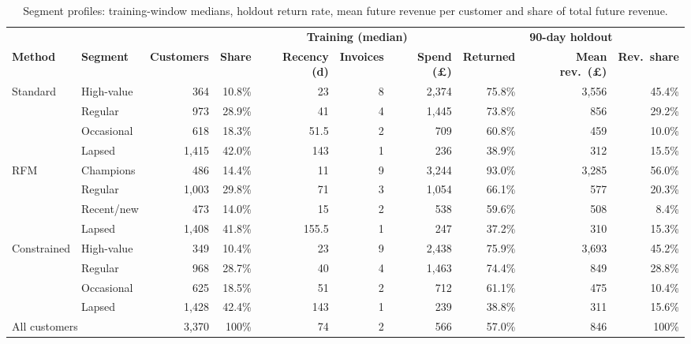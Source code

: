 \documentclass[conference,10pt]{IEEEtran}
\begin{document}
\begin{table}[t]
\centering
\caption{Segment profiles: training-window medians, holdout return rate,
mean future revenue per customer and share of total future revenue.}
\label{tab:profiles}
\footnotesize
\setlength{\tabcolsep}{3.6pt}
\begin{tabular}{llrrrrrrrr}
\toprule
 & & & & \multicolumn{3}{c}{\textbf{Training (median)}} & \multicolumn{3}{c}{\textbf{90-day holdout}}\\
\cmidrule(lr){5-7}\cmidrule(lr){8-10}
\textbf{Method} & \textbf{Segment} & \textbf{Customers} & \textbf{Share} & \textbf{Recency (d)} & \textbf{Invoices} & \textbf{Spend (\pounds)} & \textbf{Returned} & \textbf{Mean rev.\ (\pounds)} & \textbf{Rev.\ share}\\
\midrule
\multirow{4}{*}{Standard}
 & High-value  & 364   & 10.8\% & 23    & 8 & 2,374 & 75.8\% & 3,556 & 45.4\%\\
 & Regular     & 973   & 28.9\% & 41    & 4 & 1,445 & 73.8\% & 856   & 29.2\%\\
 & Occasional  & 618   & 18.3\% & 51.5  & 2 & 709   & 60.8\% & 459   & 10.0\%\\
 & Lapsed      & 1,415 & 42.0\% & 143   & 1 & 236   & 38.9\% & 312   & 15.5\%\\
\midrule
\multirow{4}{*}{RFM}
 & Champions   & 486   & 14.4\% & 11    & 9 & 3,244 & 93.0\% & 3,285 & 56.0\%\\
 & Regular     & 1,003 & 29.8\% & 71    & 3 & 1,054 & 66.1\% & 577   & 20.3\%\\
 & Recent/new  & 473   & 14.0\% & 15    & 2 & 538   & 59.6\% & 508   & 8.4\%\\
 & Lapsed      & 1,408 & 41.8\% & 155.5 & 1 & 247   & 37.2\% & 310   & 15.3\%\\
\midrule
\multirow{4}{*}{Constrained}
 & High-value  & 349   & 10.4\% & 23    & 9 & 2,438 & 75.9\% & 3,693 & 45.2\%\\
 & Regular     & 968   & 28.7\% & 40    & 4 & 1,463 & 74.4\% & 849   & 28.8\%\\
 & Occasional  & 625   & 18.5\% & 51    & 2 & 712   & 61.1\% & 475   & 10.4\%\\
 & Lapsed      & 1,428 & 42.4\% & 143   & 1 & 239   & 38.8\% & 311   & 15.6\%\\
\midrule
\multicolumn{2}{l}{All customers} & 3,370 & 100\% & 74 & 2 & 566 & 57.0\% & 846 & 100\%\\
\bottomrule
\end{tabular}
\end{table}
\end{document}
